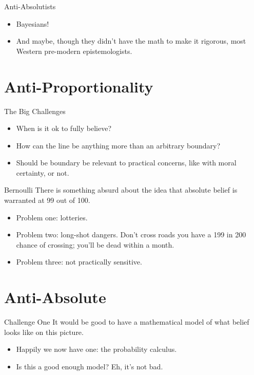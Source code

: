 \documentclass[
  17pt,
  letterpaper,
  ignorenonframetext,
  aspectratio=169,
]{beamer}
\providecommand{\tightlist}{%
  \setlength{\itemsep}{0pt}\setlength{\parskip}{0pt}}\usepackage{longtable,booktabs,array}
\begin{document}
\begin{frame}{Anti-Absolutists}
\protect\hypertarget{anti-absolutists}{}
\begin{itemize}[<+->]
\tightlist
\item
  Bayesians!
\item
  And maybe, though they didn't have the math to make it rigorous, most
  Western pre-modern epistemologists.
\end{itemize}
\end{frame}

\hypertarget{anti-proportionality}{%
\section{Anti-Proportionality}\label{anti-proportionality}}

\begin{frame}{The Big Challenges}
\protect\hypertarget{the-big-challenges}{}
\begin{itemize}[<+->]
\tightlist
\item
  When is it ok to fully believe?
\item
  How can the line be anything more than an arbitrary boundary?
\item
  Should be boundary be relevant to practical concerns, like with moral
  certainty, or not.
\end{itemize}
\end{frame}

\begin{frame}{Bernoulli}
\protect\hypertarget{bernoulli}{}
There is something absurd about the idea that absolute belief is
warranted at 99 out of 100.

\begin{itemize}[<+->]
\tightlist
\item
  Problem one: lotteries.
\item
  Problem two: long-shot dangers. Don't cross roads you have a 199 in
  200 chance of crossing; you'll be dead within a month.
\item
  Problem three: not practically sensitive.
\end{itemize}
\end{frame}

\hypertarget{anti-absolute}{%
\section{Anti-Absolute}\label{anti-absolute}}

\begin{frame}{Challenge One}
\protect\hypertarget{challenge-one}{}
It would be good to have a mathematical model of what belief looks like
on this picture.

\begin{itemize}[<+->]
\tightlist
\item
  Happily we now have one: the probability calculus.
\item
  Is this a good enough model? Eh, it's not bad.
\end{itemize}
\end{frame}
\end{document}
